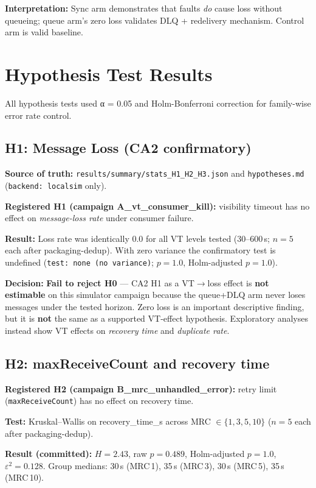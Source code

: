 \textbf{Interpretation:} Sync arm demonstrates that faults \emph{do} cause loss without queueing; queue arm's zero loss validates DLQ + redelivery mechanism. Control arm is valid baseline.

\section{Hypothesis Test Results}

All hypothesis tests used α = 0.05 and Holm-Bonferroni correction for family-wise error rate control.

\subsection{H1: Message Loss (CA2 confirmatory)}

\textbf{Source of truth:} \texttt{results/summary/stats\_H1\_H2\_H3.json} and \texttt{hypotheses.md} (\texttt{backend: localsim} only).

\textbf{Registered H1 (campaign A\_vt\_consumer\_kill):} visibility timeout has no effect on \emph{message-loss rate} under consumer failure.

\textbf{Result:} Loss rate was identically 0.0 for all VT levels tested (30--600\,s; $n=5$ each after packaging-dedup). With zero variance the confirmatory test is undefined (\texttt{test: none (no variance)}; $p=1.0$, Holm-adjusted $p=1.0$).

\textbf{Decision:} \textbf{Fail to reject H0} --- CA2 H1 as a VT$\rightarrow$loss effect is \textbf{not estimable} on this simulator campaign because the queue+DLQ arm never loses messages under the tested horizon. Zero loss is an important descriptive finding, but it is \textbf{not} the same as a supported VT-effect hypothesis. Exploratory analyses instead show VT effects on \emph{recovery time} and \emph{duplicate rate}.

\subsection{H2: maxReceiveCount and recovery time}

\textbf{Registered H2 (campaign B\_mrc\_unhandled\_error):} retry limit (\texttt{maxReceiveCount}) has no effect on recovery time.

\textbf{Test:} Kruskal--Wallis on recovery\_time\_s across MRC $\in\{1,3,5,10\}$ ($n=5$ each after packaging-dedup).

\textbf{Result (committed):} $H=2.43$, raw $p=0.489$, Holm-adjusted $p=1.0$, $\varepsilon^2=0.128$. Group medians: 30\,s (MRC\,1), 35\,s (MRC\,3), 30\,s (MRC\,5), 35\,s (MRC\,10).

